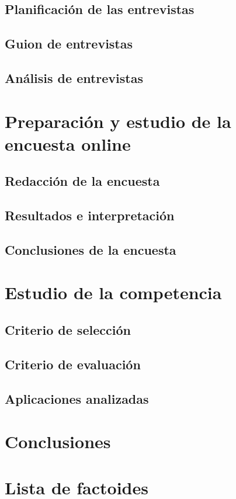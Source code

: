 \documentclass[12pt]{article}
\begin{document}
\subsection{Planificación de las entrevistas}
\subsection{Guion de entrevistas}
\subsection{Análisis de entrevistas}
\section{Preparación y estudio de la encuesta online}
\subsection{Redacción de la encuesta}
\subsection{Resultados e interpretación}
\subsection{Conclusiones de la encuesta}
\section{Estudio de la competencia}
\subsection{Criterio de selección}
\subsection{Criterio de evaluación}
\subsection{Aplicaciones analizadas}
\section{Conclusiones}
\section{Lista de factoides}
\end{document}
